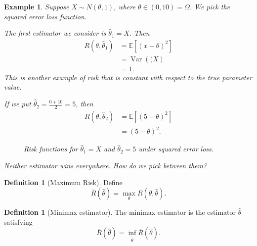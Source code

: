 \documentclass{tufte-handout}
\newcommand*\E{\mathbb{E}}
\newtheorem{ex}[thm]{Example}
\theoremstyle{definition}
\newtheorem{defn}[thm]{Definition}
\begin{document}
\begin{ex}
	Suppose $X\sim N(\theta,1)$, where $\theta \in (0,10) = \Omega$. We pick the squared error loss function.

	The first estimator we consider is $\hat{\theta}_1 = X$.
	Then
	\begin{align*}
		R(\theta, \hat{\theta}_1) &= \E\left[\left( x-\theta \right)^2\right]  \\
								  &= \operatorname{Var}\left((X\right) \\
								  &= 1
	.\end{align*}
	This is another example of risk that is constant with respect to the true parameter value.
	
	If we put $\hat{\theta}_2 = \frac{0+10}{2} = 5$, then \begin{align*}
		R(\theta, \hat{\theta}_2) &= \E\left[(5-\theta)^2\right] \\
								  &= \left( 5-\theta \right)^2
								  .\end{align*}
	\begin{figure}[h]
	\caption{Risk functions for $\hat{\theta}_1 = X$ and $\hat{\theta}_2 = 5$ under squared error loss.}
	\end{figure}

	Neither estimator wins everywhere. How do we pick between them?
\end{ex}

\begin{defn}[Maximum Risk]
	Define \[
		\overline{R}(\hat{\theta}) = \max_\theta R(\theta, \hat{\theta})
	.\] 
\end{defn}
\begin{defn}[Minimax estimator]
	The minimax estimator is the estimator $\hat{\theta}$ satisfying \[
		\overline{R}(\hat{\theta}) = \inf_{\tilde{\theta}} \overline{R}(\hat{\theta})
	.\] 
\end{defn}
\end{document}
